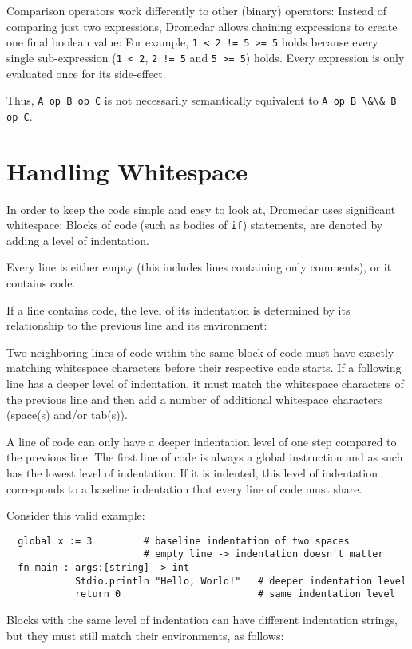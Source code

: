 \documentclass{article}
\newcommand{\code}[1]{\lstinline[columns=fixed]{#1}}
\begin{document}
		Comparison operators work differently to other (binary) operators: Instead of comparing just two expressions, Dromedar allows chaining expressions to create one final boolean value: For example, \code{1 < 2 != 5 >= 5} holds because every single sub-expression (\code{1 < 2}, \code{2 != 5} and \code{5 >= 5}) holds. Every expression is only evaluated once for its side-effect.
		
		Thus, \code{A op B op C} is not necessarily semantically equivalent to \code{A op B \&\& B op C}.
		
	\section{Handling Whitespace}
	
		In order to keep the code simple and easy to look at, Dromedar uses significant whitespace: Blocks of code (such as bodies of \code{if}) statements, are denoted by adding a level of indentation.
		
		Every line is either empty (this includes lines containing only comments), or it contains code. 
		
		If a line contains code, the level of its indentation is determined by its relationship to the previous line and its environment:
		
		Two neighboring lines of code within the same block of code must have exactly matching whitespace characters before their respective code starts. If a following line has a deeper level of indentation, it must match the whitespace characters of the previous line and then add a number of additional whitespace characters (space(s) and/or tab(s)).
		
		A line of code can only have a deeper indentation level of one step compared to the previous line. The first line of code is always a global instruction and as such has the lowest level of indentation. If it is indented, this level of indentation corresponds to a baseline indentation that every line of code must share.
		
		Consider this valid example:
		
		\begin{lstlisting}
  global x := 3 		# baseline indentation of two spaces
						# empty line -> indentation doesn't matter
  fn main : args:[string] -> int
  			Stdio.println "Hello, World!"	# deeper indentation level
  			return 0						# same indentation level
		\end{lstlisting}
		
		Blocks with the same level of indentation can have different indentation strings, but they must still match their environments, as follows:
		
\end{document}
